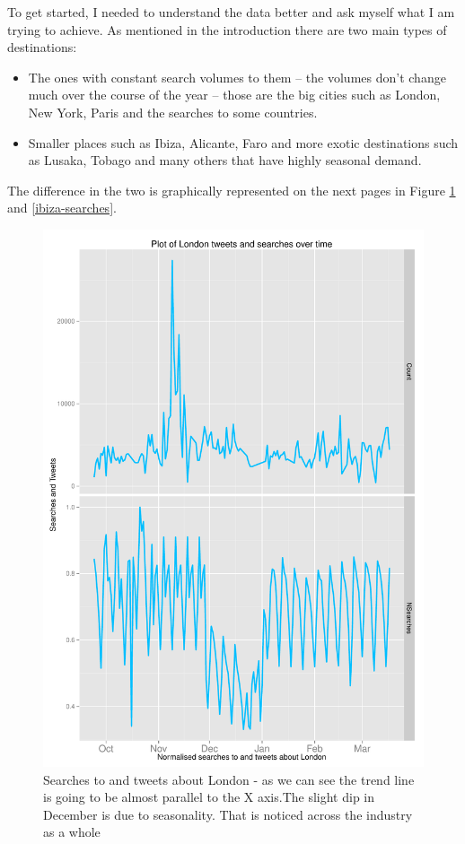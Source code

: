 \documentclass[minf,twoside,singlespacing,parskip,frontabs,notimes,11pt]{infthesis}
\begin{document}
To get started, I needed to understand the data better and ask myself what I am trying to achieve. As mentioned in the introduction there are two main types of destinations:

\begin{itemize}
\item The ones with constant search volumes to them -- the volumes don't change much over the course of the year -- those are the big cities such as London, New York, Paris and the searches to some countries. 
\item Smaller places such as Ibiza, Alicante, Faro and more exotic destinations such as Lusaka, Tobago and many others that have highly seasonal demand.
\end{itemize}
The difference in the two is graphically represented on the next pages in Figure \ref{london-searches} and \ref{ibiza-searches}. 

\begin{figure}[]
\begin{center}
\includegraphics[scale=0.7]{london-searches}
\end{center}
\caption{Searches to and tweets about London - as we can see the trend line  is going to be almost parallel to the X axis.The slight dip in December is due to seasonality. That is noticed across the industry as a whole}
\label{london-searches}
\end{figure}
\end{document}
